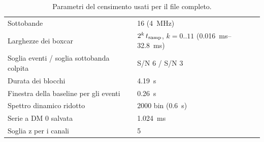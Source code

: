 \documentclass[11pt,a4paper]{article}
\begin{document}
\begin{table}[ht]
\centering
\caption{Parametri del censimento usati per il file completo.}
\label{tab:surveycfg}
\begin{tabular}{ll}
\toprule
Sottobande & 16 (\SI{4}{\mega\hertz}) \\
Larghezze dei boxcar & $2^k\,t_{\rm samp}$, $k=0..11$ (\SIrange{0.016}{32.8}{\milli\second}) \\
Soglia eventi / soglia sottobanda colpita & S/N 6 / S/N 3 \\
Durata dei blocchi & \SI{4.19}{\second} \\
Finestra della baseline per gli eventi & \SI{0.26}{\second} \\
Spettro dinamico ridotto & 2000 bin (\SI{0.6}{\second}) \\
Serie a DM 0 salvata & \SI{1.024}{\milli\second} \\
Soglia z per i canali & 5 \\
\bottomrule
\end{tabular}
\end{table}
\end{document}
